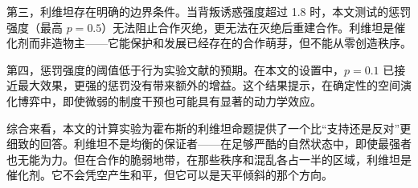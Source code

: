\documentclass[12pt,a4paper]{ctexart}
\begin{document}
第三，利维坦存在明确的边界条件。当背叛诱惑强度超过 1.8 时，本文测试的惩罚强度（最高 $p=0.5$）无法阻止合作灭绝，更无法在灭绝后重建合作。利维坦是催化剂而非造物主——它能保护和发展已经存在的合作萌芽，但不能从零创造秩序。

第四，惩罚强度的阈值低于行为实验文献的预期。在本文的设置中，$p=0.1$ 已接近最大效果，更强的惩罚没有带来额外的增益。这个结果提示，在确定性的空间演化博弈中，即使微弱的制度干预也可能具有显著的动力学效应。

综合来看，本文的计算实验为霍布斯的利维坦命题提供了一个比“支持还是反对”更细致的回答。利维坦不是均衡的保证者——在足够严酷的自然状态中，即使最强者也无能为力。但在合作的脆弱地带，在那些秩序和混乱各占一半的区域，利维坦是催化剂。它不会凭空产生和平，但它可以是天平倾斜的那个方向。

\end{document}
